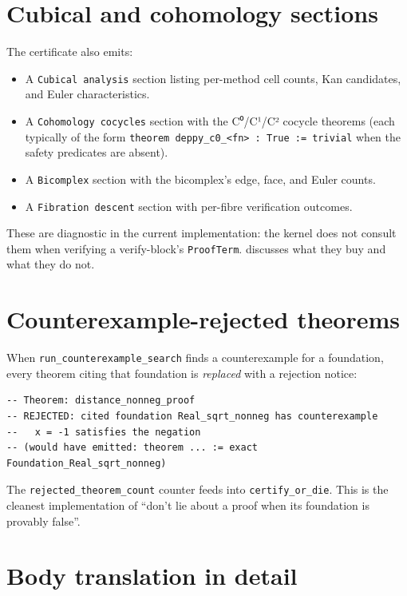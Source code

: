 \section{Cubical and cohomology sections}

The certificate also emits:
\begin{itemize}[leftmargin=1.7em]
  \item A \texttt{Cubical analysis} section listing per-method
    cell counts, Kan candidates, and Euler characteristics.
  \item A \texttt{Cohomology cocycles} section with the C⁰/C¹/C²
    cocycle theorems (each typically of the form
    \texttt{theorem deppy\_c0\_<fn> : True := trivial} when the
    safety predicates are absent).
  \item A \texttt{Bicomplex} section with the bicomplex's edge,
    face, and Euler counts.
  \item A \texttt{Fibration descent} section with per-fibre
    verification outcomes.
\end{itemize}

These are diagnostic in the current implementation: the kernel
does not consult them when verifying a verify-block's \texttt{ProofTerm}.
 discusses what they buy and what they do
not.

\section{Counterexample-rejected theorems}

When \texttt{run\_counterexample\_search} finds a counterexample
for a foundation, every theorem citing that foundation is
\emph{replaced} with a rejection notice:

\begin{lstlisting}[language=lean4]
-- Theorem: distance_nonneg_proof
-- REJECTED: cited foundation Real_sqrt_nonneg has counterexample
--   x = -1 satisfies the negation
-- (would have emitted: theorem ... := exact Foundation_Real_sqrt_nonneg)
\end{lstlisting}

The \texttt{rejected\_theorem\_count} counter feeds into
\texttt{certify\_or\_die}.  This is the cleanest implementation of
``don't lie about a proof when its foundation is provably false''.

\section{Body translation in detail}
\label{sec:body-translation-detail}

